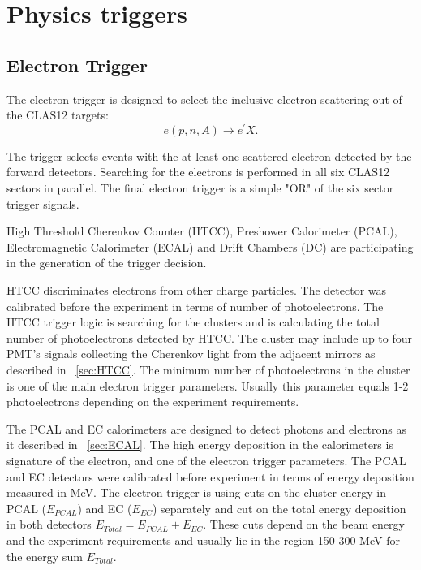 
\section{Physics triggers}
\label{sec:physics_triggers}






\subsection{Electron Trigger}
\label{sec:electron_trigger}

The electron trigger is designed to select the inclusive electron scattering out of the CLAS12 targets:
\begin{equation}
e(p,n,A)\rightarrow e^\prime X.
\label{eqn:electron}
\end{equation}
\noindent

The trigger  selects  events with the at least one scattered  electron detected by the forward detectors.
Searching for the electrons is performed  in all six CLAS12 sectors in parallel. The final electron trigger is  a simple "OR" of the six sector trigger signals.

High Threshold Cherenkov Counter (HTCC),  Preshower Calorimeter (PCAL),  Electromagnetic Calorimeter (ECAL) and Drift Chambers (DC) are participating in the generation of the trigger decision.

HTCC discriminates electrons from other charge particles. The detector was calibrated before the experiment in terms of number of photoelectrons. The HTCC trigger logic is searching for the clusters and is calculating the total number of  photoelectrons  detected by HTCC. The cluster may include up to four PMT's signals collecting the Cherenkov light from the adjacent mirrors as described in ~\ref{sec:HTCC}. The minimum number of  photoelectrons in the cluster  is one of the main electron trigger parameters. Usually this parameter equals 1-2 photoelectrons depending on the experiment requirements.

The PCAL and EC calorimeters are designed to detect photons and electrons as it described in ~\ref{sec:ECAL}. The high energy deposition in the calorimeters is signature of the electron, and one of the electron trigger parameters.
The PCAL and EC detectors were calibrated before experiment in terms of energy deposition measured in MeV.
The electron trigger is using cuts on the cluster energy  in PCAL ($E_{PCAL}$) and EC ($E_{EC}$) separately and cut on the total energy deposition in both detectors $E_{Total}=E_{PCAL}+E_{EC}$.
These cuts   depend  on the beam energy and the experiment requirements and usually lie in the region 150-300 MeV for the energy sum $E_{Total}$.

